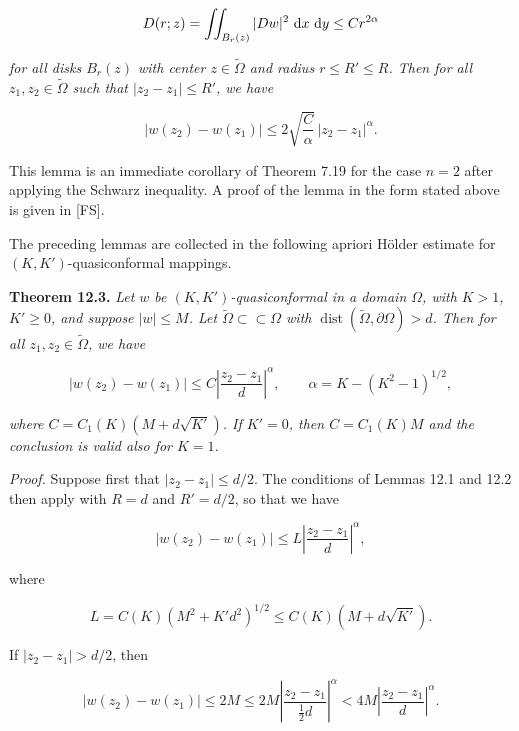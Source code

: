 \[
D(r;z)=\iint_{B_r(z)} |Dw|^2\, \,\mathrm{d} x\, \,\mathrm{d} y\le Cr^{2\alpha}
\]

\textit{for all disks $B_r(z)$ with center $z\in \widetilde{\Omega}$ and radius
$r\le R'\le R$. Then for all $z_1,z_2\in \widetilde{\Omega}$ such that
$|z_2-z_1|\le R'$, we have}

\[
|w(z_2)-w(z_1)|\le 2\sqrt{\frac{C}{\alpha}}\,|z_2-z_1|^\alpha.
\]



This lemma is an immediate corollary of Theorem 7.19 for the case $n=2$ after applying the Schwarz inequality. A proof of the lemma in the form stated above is given in [FS].

The preceding lemmas are collected in the following apriori H\"older estimate for $(K, K')$-quasiconformal mappings.

\noindent\textbf{Theorem 12.3.} \textit{Let $w$ be $(K, K')$-quasiconformal in a domain $\Omega$, with $K>1$, $K'\geq 0$, and suppose $|w|\leq M$. Let $\tilde{\Omega}\subset \subset \Omega$ with $\operatorname{dist}(\tilde{\Omega}, \partial\Omega)>d$. Then for all $z_1, z_2\in \tilde{\Omega}$, we have}

\begin{equation}
|w(z_2)-w(z_1)|\leq C\left|\frac{z_2-z_1}{d}\right|^{\alpha}, \qquad \alpha=K-(K^2-1)^{1/2},
\tag{12.14}
\end{equation}

\noindent\textit{where $C=C_1(K)(M+d\sqrt{K'})$. If $K'=0$, then $C=C_1(K)M$ and the conclusion is valid also for $K=1$.}

\medskip

\noindent\textit{Proof.} Suppose first that $|z_2-z_1|\leq d/2$. The conditions of Lemmas 12.1 and 12.2 then apply with $R=d$ and $R'=d/2$, so that we have

\begin{equation*}
|w(z_2)-w(z_1)|\leq L\left|\frac{z_2-z_1}{d}\right|^{\alpha},
\end{equation*}

\noindent where

\[
L=C(K)(M^2+K'd^2)^{1/2}\leq C(K)(M+d\sqrt{K'}).
\]

If $|z_2-z_1|>d/2$, then

\begin{equation*}
|w(z_2)-w(z_1)|\leq 2M\leq 2M\left|\frac{z_2-z_1}{\tfrac12 d}\right|^{\alpha}<4M\left|\frac{z_2-z_1}{d}\right|^{\alpha}.
\end{equation*}

